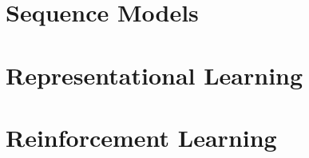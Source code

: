 \documentclass[12pt, a4paper, oneside, fleqn]{notes}
\begin{document}
\chapter{Sequence Models}

\chapter{Representational Learning}

\chapter{Reinforcement Learning}
\end{document}
